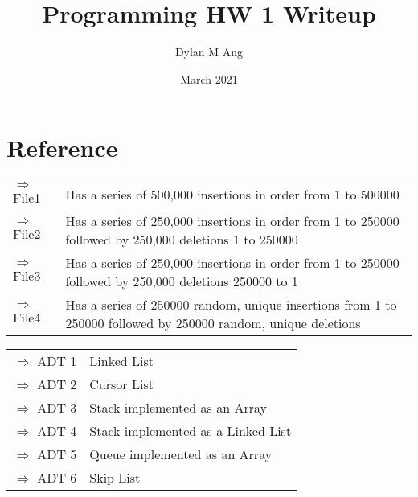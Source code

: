 \documentclass[12pt]{article}
\title{Programming HW 1 Writeup}
\author{Dylan M Ang}
\date{March 2021}
\begin{document}
\maketitle

\tableofcontents

\section{Reference}
\begin{center}
    \begin{tabular}{p{3cm} p{12cm}}
        $\Rightarrow$ File1 & Has a series of 500,000 insertions in order from 1 to 500000                                                  \\
        $\Rightarrow$ File2 & Has a series of 250,000 insertions in order from 1 to 250000 followed by 250,000 deletions 1 to 250000        \\
        $\Rightarrow$ File3 & Has a series of 250,000 insertions in order from 1 to 250000 followed by 250,000 deletions 250000 to 1        \\
        $\Rightarrow$ File4 & Has a series of 250000 random, unique insertions from 1 to 250000 followed by 250000 random, unique deletions \\
    \end{tabular}
    \begin{tabular}{p{3cm} p{12cm}}
        $\Rightarrow$ ADT 1 & Linked List                        \\
        $\Rightarrow$ ADT 2 & Cursor List                        \\
        $\Rightarrow$ ADT 3 & Stack implemented as an Array      \\
        $\Rightarrow$ ADT 4 & Stack implemented as a Linked List \\
        $\Rightarrow$ ADT 5 & Queue implemented as an Array      \\
        $\Rightarrow$ ADT 6 & Skip List                          \\
    \end{tabular}
\end{center}

\end{document}
